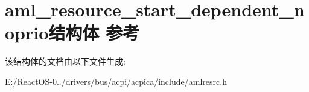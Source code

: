 \hypertarget{structaml__resource__start__dependent__noprio}{}\section{aml\+\_\+resource\+\_\+start\+\_\+dependent\+\_\+noprio结构体 参考}
\label{structaml__resource__start__dependent__noprio}


该结构体的文档由以下文件生成\+:\begin{DoxyCompactItemize}
\item 
E\+:/\+React\+O\+S-\/0../drivers/bus/acpi/acpica/include/amlresrc.\+h\end{DoxyCompactItemize}
